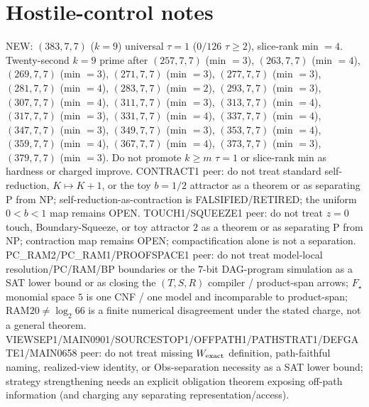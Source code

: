 \documentclass[11pt]{article}
\begin{document}
\section*{Hostile-control notes}
NEW: $(383,7,7)$ ($k{=}9$) universal $\tau{=}1$ ($0/126$ $\tau{\ge}2$), slice-rank min $=4$.
Twenty-second $k{=}9$ prime after $(257,7,7)$ (min $=3$), $(263,7,7)$ (min $=4$), $(269,7,7)$ (min $=3$), $(271,7,7)$ (min $=3$), $(277,7,7)$ (min $=3$), $(281,7,7)$ (min $=4$), $(283,7,7)$ (min $=2$), $(293,7,7)$ (min $=3$), $(307,7,7)$ (min $=4$), $(311,7,7)$ (min $=3$), $(313,7,7)$ (min $=4$), $(317,7,7)$ (min $=3$), $(331,7,7)$ (min $=4$), $(337,7,7)$ (min $=4$), $(347,7,7)$ (min $=3$), $(349,7,7)$ (min $=3$), $(353,7,7)$ (min $=4$), $(359,7,7)$ (min $=4$), $(367,7,7)$ (min $=4$), $(373,7,7)$ (min $=3$), $(379,7,7)$ (min $=3$).
Do not promote $k{\ge}m$ $\tau{=}1$ or slice-rank min as hardness or charged improve.
CONTRACT1 peer: do not treat standard self-reduction, $K\mapsto K+1$, or the toy $b{=}1/2$ attractor as a theorem or as separating P from NP;
self-reduction-as-contraction is FALSIFIED/RETIRED; the uniform $0{<}b{<}1$ map remains OPEN.
TOUCH1/SQUEEZE1 peer: do not treat $z{=}0$ touch, Boundary-Squeeze, or toy attractor $2$ as a theorem or as separating P from NP;
contraction map remains OPEN; compactification alone is not a separation.
PC\_RAM2/PC\_RAM1/PROOFSPACE1 peer: do not treat model-local resolution/PC/RAM/BP boundaries or the $7$-bit DAG-program simulation as a SAT lower bound
or as closing the $(T,S,R)$ compiler / product-span arrows; $F_\star$ monomial space $5$ is one CNF / one model and incomparable to product-span;
RAM$20\neq\log_2 66$ is a finite numerical disagreement under the stated charge, not a general theorem.
VIEWSEP1/MAIN0901/SOURCESTOP1/OFFPATH1/PATHSTRAT1/DEFGATE1/MAIN0658 peer: do not treat missing $W_{\rm exact}$ definition,
path-faithful naming, realized-view identity, or Obs-separation necessity as a SAT lower bound;
strategy strengthening needs an explicit obligation theorem exposing off-path information
(and charging any separating representation/access).
\end{document}
